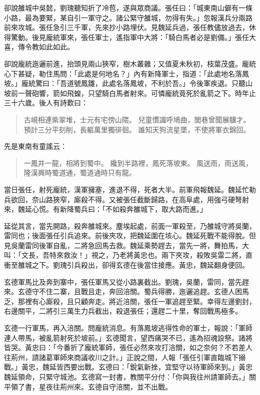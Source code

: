 卻說雒城中吳懿，劉瑰聽知折了冷苞，遂與眾商議。張任曰：「城東南山僻有一條小路，最為要緊，某自引一軍守之。諸公緊守雒城，勿得有失。」忽報漢兵分兩路前來攻城。張任急引三千軍，先來抄小路埋伏。見魏延兵過，張任教儘放過去，休得驚動。後見龐統軍來，張任軍士，遙指軍中大將：「騎白馬者必是劉備。」張任大喜，傳令教如此如此。

卻說龐統迤邐前進，抬頭見兩山狹窄，樹木叢雜；又值夏未秋初，枝葉茂盛。龐統心下甚疑，勒住馬問：「此處是何地名？」內有新降軍士，指道：「此處地名落鳳坡。」龐統驚曰：「吾道號鳳雛，此處名落鳳坡，不利於吾。」令後軍疾退。只聽山坡前一聲砲響，箭如飛蝗，只望騎白馬者射來。可憐龐統竟死於亂箭之下。時年止三十六歲。後人有詩歎曰：

\begin{quote}
古峴相連紫翠堆，士元有宅傍山隈。
兒童慣識呼鳩曲，閭巷曾聞展驥才。
預計三分平刻削，長軀萬里獨徘徊。
誰知天狗流星墜，不使將軍衣錦回。
\end{quote}

先是東南有童謠云：

\begin{quote}
一鳳并一龍，相將到蜀中。
纔到半路裡，鳳死落坡東。
風送雨，雨送風，隆漢興時蜀道通，蜀道通時只有龍。
\end{quote}

當日張任，射死龐統，漢軍擁塞，進退不得，死者大半。前軍飛報魏延。魏延忙勒兵欲回，奈山路狹窄，廝殺不得。又被張任截斷歸路，在高阜處，用強弓硬弩射來，魏延心慌。有新降蜀兵曰：「不如殺奔雒城下，取大路而進。」

延從其言，當先開路，殺奔雒城來。塵埃起處，前面一軍殺至，乃雒城守將吳蘭，雷同也；後面張任引兵追來。前後夾攻，把魏延圍在垓心。魏延死戰不能得脫。但見吳蘭雷同後軍自亂，二將急回馬去救。魏延乘勢趕去，當先一將，舞拍馬，大叫：「文長，吾特來救汝！」視之，乃老將黃忠也。兩下夾攻，殺敗吳雷二將，直衝至雒城之下。劉瑰引兵殺出，卻得玄德在後當住接應。黃忠，魏延翻身便回。

玄德軍馬比及奔到寨中，張任軍馬又從小路裏截出。劉瑰，吳蘭，雷同，當先趕來。玄德守不住二寨，且戰且走，奔回涪關。蜀兵得勝，迤邐追趕。玄德人困馬乏，那裡有心廝殺，且只顧奔走。將近涪關，張任一軍追趕至緊。幸得左邊劉封，右邊關平，二將引三萬生力兵截出，殺退張任；還趕二十里，奪回戰馬極多。

玄德一行軍馬，再入涪關。問龐統消息。有落鳳坡逃得性命的軍士，報說：「軍師連人帶馬，被亂箭射死於坡前。」玄德聞言，望西痛哭不已，遙為招魂設祭。諸將皆哭。黃忠曰：「今番折了龐統軍師，張任必然來攻打涪關，如之奈何？不若差人往荊州，請諸葛軍師來商議收川之計。」正說之間，人報「張任引軍直臨城下搦戰。」黃忠，魏延皆西要出戰。玄德曰：「銳氣新挫，宜堅守以待軍師來到。」黃忠魏延領命，只緊守城池。玄德寫一封書，教關平分付：「你與我往州請軍師去。」關平領了書，星夜往荊州來。玄德自守涪關，並不出戰。

